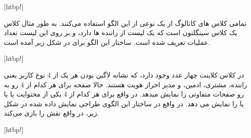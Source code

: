 	[htbp!]


 
تمامی کلاس های کاتالوگ از یک نوعی از این الگو استفاده می‌کنند. به طور مثال کلاس
یک کلاس سینگلتون است که یک لیست از راننده ها دارد، و بر روی این لیست تعداد عملیات تعریف شده است. ساختار این الگو برای
در شکل زیر آمده است.

	[htbp!]

 
در کلاس کلاینت چهار عدد 
وجود دارد، که نشانه لاگین بودن هر یک از 4 نوع کاربر یعنی راننده، مشتری، ادمین،  و مدیر احراز هویت هستند.
حالا صفحه 
برای هر کدام از 4 
رو به رو صفحات متفاوتی را نمایش میدهد. در واقع برای هر کدام از 4 
یکی از محتوایت 
یا
یا
یا
را نمایش می دهد. در واقع در ساختار این الگوی طراحی نمایش داده شده در شکل زیر، 
در واقع نقش 
را بازی می‌کند.


	[htbp!]





